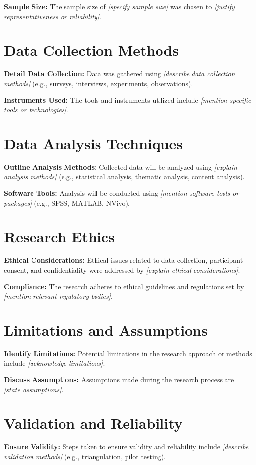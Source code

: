 	\textbf{Sample Size:} The sample size of \textit{[specify sample size]} was chosen to \textit{[justify representativeness or reliability]}.
	
	\section{Data Collection Methods}
	\textbf{Detail Data Collection:} Data was gathered using \textit{[describe data collection methods]} (e.g., surveys, interviews, experiments, observations).
	
	\textbf{Instruments Used:} The tools and instruments utilized include \textit{[mention specific tools or technologies]}.
	
	\section{Data Analysis Techniques}
	\textbf{Outline Analysis Methods:} Collected data will be analyzed using \textit{[explain analysis methods]} (e.g., statistical analysis, thematic analysis, content analysis).
	
	\textbf{Software Tools:} Analysis will be conducted using \textit{[mention software tools or packages]} (e.g., SPSS, MATLAB, NVivo).
	
	\section{Research Ethics}
	\textbf{Ethical Considerations:} Ethical issues related to data collection, participant consent, and confidentiality were addressed by \textit{[explain ethical considerations]}.
	
	\textbf{Compliance:} The research adheres to ethical guidelines and regulations set by \textit{[mention relevant regulatory bodies]}.
	
	\section{Limitations and Assumptions}
	\textbf{Identify Limitations:} Potential limitations in the research approach or methods include \textit{[acknowledge limitations]}.
	
	\textbf{Discuss Assumptions:} Assumptions made during the research process are \textit{[state assumptions]}.
	
	\section{Validation and Reliability}
	\textbf{Ensure Validity:} Steps taken to ensure validity and reliability include \textit{[describe validation methods]} (e.g., triangulation, pilot testing).
	
